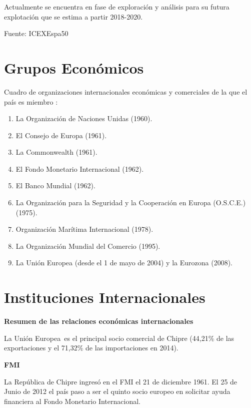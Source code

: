 \documentclass[a4paper,openright,12pt]{book}
\begin{document}
\*Actualmente se encuentra en fase de exploración y análisis para su futura explotación que se estima a partir 2018-2020.

Fuente: ICEXEspa50

\section{Grupos Económicos}

Cuadro de organizaciones internacionales económicas y comerciales de la que el país es miembro \cite{ICEXchipreGrupos:online}:


\begin{enumerate}
    \item La Organización de Naciones Unidas (1960).
    \item El Consejo de Europa (1961).
    \item La Commonwealth (1961).
    \item El Fondo Monetario Internacional (1962).
    \item El Banco Mundial (1962).
    \item La Organización para la Seguridad y la Cooperación en Europa (O.S.C.E.) (1975).                               
    \item Organización Marítima Internacional (1978).
    \item La Organización Mundial del Comercio (1995).
    \item La Unión Europea (desde el 1 de mayo de 2004) y la Eurozona (2008).
\end{enumerate}


\section{Instituciones Internacionales}

\textbf{Resumen de las relaciones económicas internacionales} \cite{ICEXChipre96:online}

La Unión Europea es el principal socio comercial de Chipre (44,21\% de las exportaciones y el 71,32\% de las importaciones en 2014).

\textbf{FMI}


La República de Chipre ingresó en el FMI el 21 de diciembre 1961. El 25 de Junio de 2012 el país paso a ser   el quinto socio europeo en solicitar ayuda financiera al Fondo Monetario Internacional.
\end{document}
